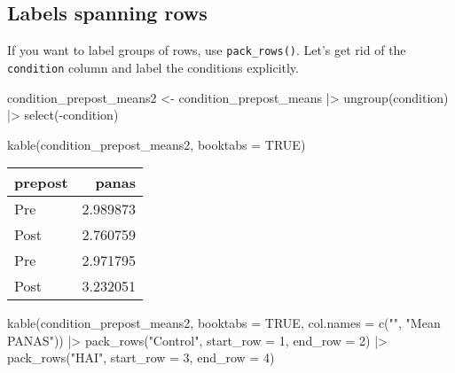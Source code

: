 \documentclass[
  doc]{apa6}
\newenvironment{Shaded}{\begin{snugshade}}{\end{snugshade}}
\newcommand{\AttributeTok}[1]{\textcolor[rgb]{0.77,0.63,0.00}{#1}}
\newcommand{\ConstantTok}[1]{\textcolor[rgb]{0.00,0.00,0.00}{#1}}
\newcommand{\DecValTok}[1]{\textcolor[rgb]{0.00,0.00,0.81}{#1}}
\newcommand{\FunctionTok}[1]{\textcolor[rgb]{0.00,0.00,0.00}{#1}}
\newcommand{\NormalTok}[1]{#1}
\newcommand{\OtherTok}[1]{\textcolor[rgb]{0.56,0.35,0.01}{#1}}
\newcommand{\SpecialCharTok}[1]{\textcolor[rgb]{0.00,0.00,0.00}{#1}}
\newcommand{\StringTok}[1]{\textcolor[rgb]{0.31,0.60,0.02}{#1}}
\begin{document}
\newpage

\hypertarget{labels-spanning-rows}{%
\subsection{Labels spanning rows}\label{labels-spanning-rows}}

If you want to label groups of rows, use \texttt{pack\_rows()}. Let's get rid of the \texttt{condition} column and label the conditions explicitly.

\begin{Shaded}
\begin{Highlighting}[]
\NormalTok{condition\_prepost\_means2 }\OtherTok{\textless{}{-}}\NormalTok{ condition\_prepost\_means }\SpecialCharTok{|\textgreater{}}
  \FunctionTok{ungroup}\NormalTok{(condition) }\SpecialCharTok{|\textgreater{}}
  \FunctionTok{select}\NormalTok{(}\SpecialCharTok{{-}}\NormalTok{condition)}
\end{Highlighting}
\end{Shaded}

\begin{Shaded}
\begin{Highlighting}[]
\FunctionTok{kable}\NormalTok{(condition\_prepost\_means2, }
      \AttributeTok{booktabs =} \ConstantTok{TRUE}\NormalTok{)}
\end{Highlighting}
\end{Shaded}

\begin{tabular}{lr}
\toprule
prepost & panas\\
\midrule
Pre & 2.989873\\
Post & 2.760759\\
Pre & 2.971795\\
Post & 3.232051\\
\bottomrule
\end{tabular}

\begin{Shaded}
\begin{Highlighting}[]
\FunctionTok{kable}\NormalTok{(condition\_prepost\_means2, }
      \AttributeTok{booktabs =} \ConstantTok{TRUE}\NormalTok{,}
      \AttributeTok{col.names =} \FunctionTok{c}\NormalTok{(}\StringTok{""}\NormalTok{, }\StringTok{"Mean PANAS"}\NormalTok{)) }\SpecialCharTok{|\textgreater{}}
  \FunctionTok{pack\_rows}\NormalTok{(}\StringTok{"Control"}\NormalTok{, }\AttributeTok{start\_row =} \DecValTok{1}\NormalTok{, }\AttributeTok{end\_row =} \DecValTok{2}\NormalTok{) }\SpecialCharTok{|\textgreater{}}
  \FunctionTok{pack\_rows}\NormalTok{(}\StringTok{"HAI"}\NormalTok{, }\AttributeTok{start\_row =} \DecValTok{3}\NormalTok{, }\AttributeTok{end\_row =} \DecValTok{4}\NormalTok{)}
\end{Highlighting}
\end{Shaded}
\end{document}
